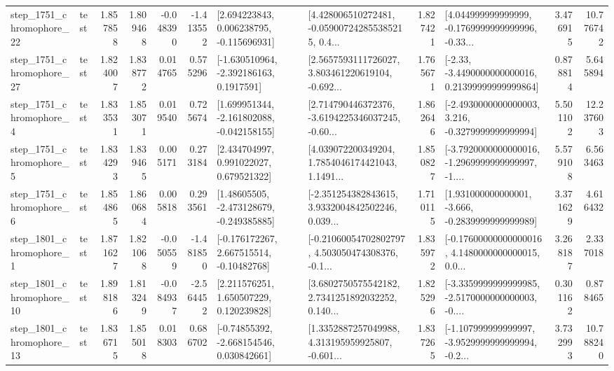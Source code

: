 \begin{tabular}{llrrrrllrlrr}
 step\_1751\_chromophore\_22 &      test &      1.857858 &    1.809468 &     -0.048390 & -1.413552 &    [2.694223843, 0.006238795, -0.115696931] &  [4.428006510272481, -0.059007242855385215, 0.4... &       1.827421 &  [4.044999999999999, -0.1769999999999996, -0.33... &            3.476915 &         10.776742 \\
 step\_1751\_chromophore\_27 &      test &      1.824007 &    1.838772 &      0.014765 &  0.575296 &     [-1.630510964, -2.392186163, 0.1917591] &  [2.5657593111726027, 3.803461220619104, -0.692... &       1.765671 &  [-2.33, -3.4490000000000016, 0.21399999999999864] &            0.878814 &          5.645894 \\
  step\_1751\_chromophore\_4 &      test &      1.833531 &    1.853071 &      0.019540 &  0.725674 &   [1.699951344, -2.161802088, -0.042158155] &  [2.714790446372376, -3.6194225346037245, -0.60... &       1.862646 &  [-2.4930000000000003, 3.216, -0.3279999999999994] &            5.501102 &         12.237603 \\
  step\_1751\_chromophore\_5 &      test &      1.834293 &    1.839465 &      0.005171 &  0.273184 &     [2.434704997, 0.991022027, 0.679521322] &  [4.039072200349204, 1.7854046174421043, 1.1491... &       1.850827 &  [-3.7920000000000016, -1.2969999999999997, -1.... &            5.579108 &          6.563463 \\
  step\_1751\_chromophore\_6 &      test &      1.854865 &    1.860684 &      0.005818 &  0.293561 &    [1.48605505, -2.473128679, -0.249385885] &  [-2.351254382843615, 3.9332004842502246, 0.039... &       1.710115 &   [1.931000000000001, -3.666, -0.2839999999999989] &            3.371629 &          4.616432 \\
  step\_1801\_chromophore\_1 &      test &      1.871627 &    1.821068 &     -0.050559 & -1.481850 &    [-0.176172267, 2.667515514, -0.10482768] &  [-0.21060054702802797, 4.503050474308376, -0.1... &       1.835972 &  [-0.17600000000000016, 4.1480000000000015, 0.0... &            3.268187 &          2.337018 \\
 step\_1801\_chromophore\_10 &      test &      1.898186 &    1.813249 &     -0.084937 & -2.564452 &     [2.211576251, 1.650507229, 0.120239828] &  [3.6802750575542182, 2.7341251892032252, 0.140... &       1.825296 &  [-3.3359999999999985, -2.5170000000000003, -0.... &            0.301162 &          0.878465 \\
 step\_1801\_chromophore\_13 &      test &      1.836715 &    1.855018 &      0.018303 &  0.686702 &    [-0.74855392, -2.668154546, 0.030842661] &  [1.3352887257049988, 4.313195959925807, -0.601... &       1.837265 &  [-1.107999999999997, -3.9529999999999994, -0.2... &            3.732993 &         10.788240 \\

\end{tabular}
